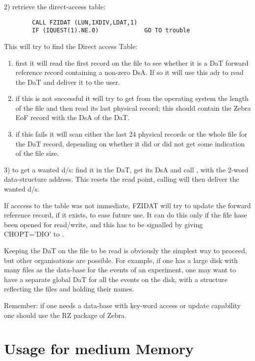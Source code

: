 2) retrieve the direct-access table:
\begin{verbatim}
        CALL FZIDAT (LUN,IXDIV,LDAT,1)
        IF (IQUEST(1).NE.0)             GO TO trouble
\end{verbatim}
   \hspace*{4mm} This will try to find the Direct access Table:
\begin{enumerate}
\item first it will read the first record on the file to see whether
      it is a DaT forward reference record containing a non-zero DsA.
      If so it will use this adr to read the DaT and deliver it to the user.
\item if this is not successful it will try to get from the operating
      system the length of the file and then read its last physical record;
      this should contain the Zebra EoF record with the DsA of the DaT.
\item if this fails it will scan either the last 24 physical records
      or the whole file for the DaT record, depending on whether
      it did or did not get some indication of the file size.
\end{enumerate}

3) to get a wanted d/s: find it in the DaT, get its DsA
and call ,
with  the 2-word data-structure address.
This resets the read point, calling  will then
deliver the wanted d/s.

If acccess to the table was not immediate,
FZIDAT will try to update the forward reference record, if it exists,
to ease future use.
It can do this only if the file hase been opened for read/write,
and this has to be signalled by giving CHOPT='DIO' to .

Keeping the DaT on the file to be read is obviously the simplest
way to proceed, but other organisations are possible.
For example, if one has a large disk with many files as the
data-base for the events of an experiment,
one may want to have a separate global DaT
for all the events on the disk,
with a structure reflecting the files and holding their names.

Remember: if one needs a data-base with key-word access
or update capability one should use the RZ package of Zebra.

\section{Usage for medium Memory}
\label{sec:FZMEMO}

